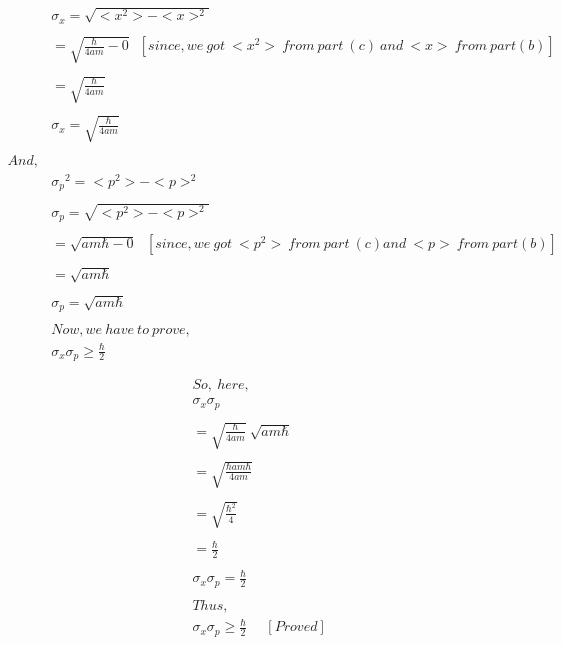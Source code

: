 \documentclass{article}
\begin{document}
\begin{homeworkProblem}
\begin{align*}
  &\sigma_{x}=\sqrt{<x^{2}> - <x>^{2}}\\\\
  &=\sqrt{\frac{\hbar}{4am} -0}\ \ \ [since, we\ got \ <x^{2}> \ from\ part\ (c)\ and\ <x>\ from\ part(b)]\\\\
  &=\sqrt{\frac{\hbar}{4am}}\\\\
  &\sigma_{x}=\sqrt{\frac{\hbar}{4am}}\\\\
  And,\\
  &{\sigma_{p}}^{2}= <p^{2}> - <p>^{2}\\\\
  &\sigma_{p}=\sqrt{<p^{2}> - <p>^{2}}\\\\
  &=\sqrt{am\hbar - 0}\ \ \ [since, we\ got \ <p^{2}> \ from\ part\ (c)and\ <p>\ from\ part(b)]\\\\
  &=\sqrt{am\hbar}\\\\
  &\sigma_{p}=\sqrt{am\hbar}\\\\
  &Now,we\ have\ to\ prove,\\
  &\sigma_{x}\sigma_{p}\geqslant \frac{\hbar}{2}\\\\
\end{align*}
\newpage\vspace{5mm}
\hspace{20mm}
\large
\begin{align*}
  &So, \ here,\\
  &\sigma_{x}\sigma_{p}\\\\
  &=\sqrt{\frac{\hbar}{4am}}\ \sqrt{am\hbar}\\\\
  &=\sqrt{\frac{\hbar am\hbar}{4am}}\\\\
  &=\sqrt{\frac{\hbar^{2}}{4}}\\\\
  &=\frac{\hbar}{2}\\\\
  &\sigma_{x}\sigma_{p}=\frac{\hbar}{2}\\\\
  &Thus,\\
  &\sigma_{x}\sigma_{p}\geqslant \frac{\hbar}{2} \ \ \ \ \ \ [Proved]\\\\ 

\end{align*}
\end{homeworkProblem}
\end{document}
